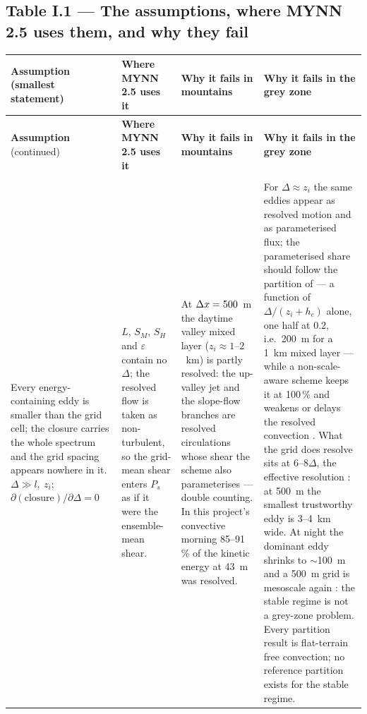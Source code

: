 \subsection*{Table I.1 --- The assumptions, where MYNN 2.5 uses them, and why they fail}
\footnotesize
\setlength{\tabcolsep}{4pt}
\renewcommand{\arraystretch}{1.12}
\begin{xltabular}{\linewidth}{@{}>{\hsize\raggedright\arraybackslash}X
  >{\hsize\raggedright\arraybackslash}X
  >{\hsize\raggedright\arraybackslash}X
  >{\hsize\raggedright\arraybackslash}X@{}}
\toprule
\textbf{Assumption} (smallest statement) & \textbf{Where MYNN 2.5 uses it} & \textbf{Why it fails in mountains} & \textbf{Why it fails in the grey zone} \\
\midrule
\endfirsthead
\toprule
\textbf{Assumption} (continued) & \textbf{Where MYNN 2.5 uses it} & \textbf{Why it fails in mountains} & \textbf{Why it fails in the grey zone} \\
\midrule
\endhead
\bottomrule
\endlastfoot
{} \\
\addlinespace[2pt]
 Every energy-containing eddy is smaller than the grid cell; the closure carries the whole spectrum and the grid spacing appears nowhere in it. \newline $\Delta \gg l,\ z_i$; \ $\partial(\text{closure})/\partial\Delta = 0$ &
$L$, $S_M$, $S_H$ and $\varepsilon$ contain no $\Delta$; the resolved flow is taken as non-turbulent, so the grid-mean shear enters $P_s$ as if it were the ensemble-mean shear. &
At $\Delta x = 500$~m the daytime valley mixed layer ($z_i \approx 1$--$2$~km) is partly resolved: the up-valley jet and the slope-flow branches are resolved circulations whose shear the scheme also parameterises --- double counting. In this project's convective morning 85--91\,\% of the kinetic energy at 43~m was resolved.  &
For $\Delta \approx z_i$ the same eddies appear as resolved motion and as parameterised flux; the parameterised share should follow the partition of \textcite{honnert2011} --- a function of $\Delta/(z_i + h_c)$ alone, one half at 0.2, i.e.\ 200~m for a 1~km mixed layer --- while a non-scale-aware scheme keeps it at 100\,\% and weakens or delays the resolved convection \parencite{ching2014}. What the grid does resolve sits at $6$--$8\Delta$, the effective resolution \parencite{skamarock2004,zhou2014}: at 500~m the smallest trustworthy eddy is 3--4~km wide. At night the dominant eddy shrinks to $\sim$100~m and a 500~m grid is mesoscale again \parencite{zhou2014}: the stable regime is not a grey-zone problem. Every partition result is flat-terrain free convection; no reference partition exists for the stable regime.  \\

\end{xltabular}
